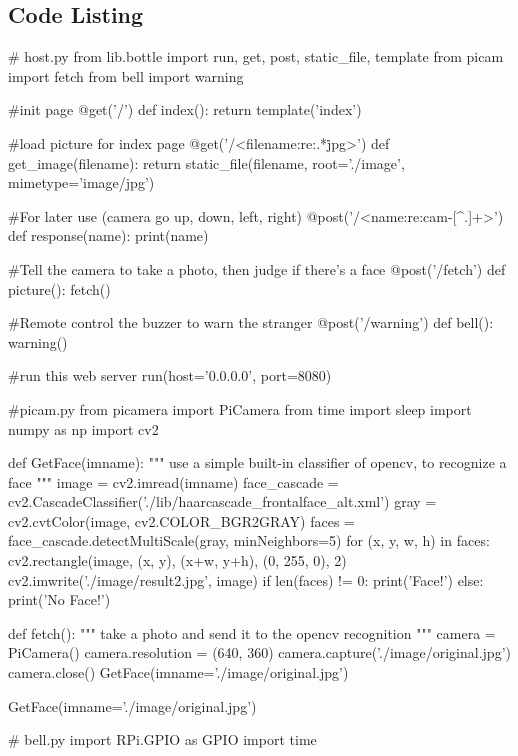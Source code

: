 \documentclass{article}
\begin{document}
\begin{appendices}
\section{Code Listing}
\begin{python}
# host.py
from lib.bottle import run, get, post, static_file, template
from picam import fetch
from bell import warning

#init page
@get('/')
def index():
    return template('index')

#load picture for index page
@get('/<filename:re:.*\.jpg>')
def get_image(filename):
    return static_file(filename, root='./image', mimetype='image/jpg')

#For later use (camera go up, down, left, right)
@post('/<name:re:cam-[^.]+>')
def response(name):
    print(name)

#Tell the camera to take a photo, then judge if there's a face
@post('/fetch')
def picture():
    fetch()

#Remote control the buzzer to warn the stranger
@post('/warning')
def bell():
    warning()

#run this web server
run(host='0.0.0.0', port=8080)
\end{python}

\begin{python}
#picam.py
from picamera import PiCamera 
from time import sleep
import numpy as np
import cv2

def GetFace(imname):
    """
    use a simple built-in classifier of opencv, to recognize a face
    """
    image = cv2.imread(imname)
    face_cascade = cv2.CascadeClassifier('./lib/haarcascade_frontalface_alt.xml')
    gray = cv2.cvtColor(image, cv2.COLOR_BGR2GRAY)
    faces = face_cascade.detectMultiScale(gray, minNeighbors=5)
    for (x, y, w, h) in faces:
        cv2.rectangle(image, (x, y), (x+w, y+h), (0, 255, 0), 2)
    cv2.imwrite('./image/result2.jpg', image)
    if len(faces) != 0:
        print('Face!')
    else:
        print('No Face!')

def fetch():
    """
    take a photo and send it to the opencv recognition
    """
    camera = PiCamera()
    camera.resolution = (640, 360)
    camera.capture('./image/original.jpg')
    camera.close()
    GetFace(imname='./image/original.jpg')

GetFace(imname='./image/original.jpg')
\end{python}

\begin{python}
# bell.py
import RPi.GPIO as GPIO
import time


\end{python}
\end{appendices}
\end{document}
